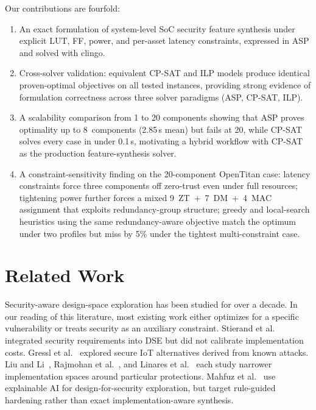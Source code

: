 \documentclass[conference]{IEEEtran}
\begin{document}
Our contributions are fourfold:
\begin{enumerate}
\item An exact formulation of system-level SoC security feature
synthesis under explicit LUT, FF, power, and per-asset latency
constraints, expressed in ASP and solved with clingo.
\item Cross-solver validation: equivalent CP-SAT and ILP models produce
identical proven-optimal objectives on all tested instances, providing
strong evidence of formulation correctness across three solver
paradigms (ASP, CP-SAT, ILP).
\item A scalability comparison from 1 to 20 components showing that
ASP proves optimality up to 8~components (2.85\,s mean) but fails at
20, while CP-SAT solves every case in under 0.1\,s, motivating a
hybrid workflow with CP-SAT as the production feature-synthesis solver.
\item A constraint-sensitivity finding on the 20-component OpenTitan
case: latency constraints force three components off zero-trust even
under full resources; tightening power further forces a mixed
9~ZT~+~7~DM~+~4~MAC assignment that exploits redundancy-group
structure; greedy and local-search heuristics using the same
redundancy-aware objective match the optimum under two profiles
but miss by 5\% under the tightest multi-constraint case.
\end{enumerate}

\section{Related Work}

Security-aware design-space exploration has been studied for over a
decade. In our reading of this literature, most existing work either
optimizes for a specific vulnerability or treats security as an
auxiliary constraint.
Stierand et al.~\cite{stierand_integrating_2014} integrated security
requirements into DSE but did not calibrate implementation costs.
Gressl et al.~\cite{gressl_security_2019, gressl_design_2021}
explored secure IoT alternatives derived from known attacks.
Liu and Li~\cite{liu_hardware_2015}, Rajmohan
et al.~\cite{rajmohan_hybrid_2020}, and Linares et
al.~\cite{linares_design_2021} each study narrower implementation
spaces around particular protections. Mahfuz
et al.~\cite{mahfuz_x-dfs_2025} use explainable AI for
design-for-security exploration, but target rule-guided hardening rather
than exact implementation-aware synthesis.
\end{document}
